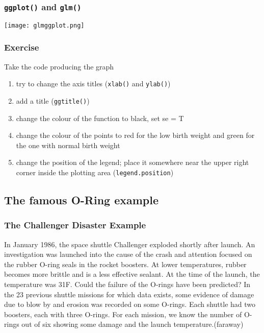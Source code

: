 \begin{frame}\frametitle{\texttt{ggplot()} and \texttt{glm()}}
  \begin{center}
    \texttt{[image: glmggplot.png]}
  \end{center}
\end{frame}


\begin{frame}[fragile]\frametitle{Exercise}
Take the code producing the graph
  \begin{enumerate}
  \item try to change the axis titles (\texttt{xlab()} and \texttt{ylab()})
  \item add a title (\texttt{ggtitle()})
  \item change the colour of the function to black, set se = T
  \item change the colour of the points to red for the low birth weight and green for the one with normal birth weight
  \item change the position of the legend; place it somewhere near the upper right corner inside the plotting area (\texttt{legend.position})
  \end{enumerate}
\end{frame}

\subsection{The famous O-Ring example}

\begin{frame}[fragile]\frametitle{The Challenger Disaster Example}
In January 1986, the space shuttle Challenger exploded shortly after launch. An
investigation was launched into the cause of the crash and attention focused on the rubber
O-ring seals in the rocket boosters. At lower temperatures, rubber becomes more brittle
and is a less effective sealant. At the time of the launch, the temperature was 31\degree F. Could
the failure of the O-rings have been predicted? In the 23 previous shuttle missions for
which data exists, some evidence of damage due to blow by and erosion was recorded on
some O-rings. Each shuttle had two boosters, each with three O-rings. For each mission,
we know the number of O-rings out of six showing some damage and the launch
temperature.(faraway)
\end{frame}

